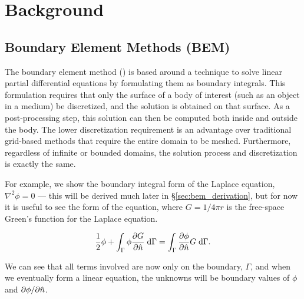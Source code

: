 
\chapter{Background}
\label{chapter:background}
\thispagestyle{myheadings}

\graphicspath{{./Background/}}

\section{Boundary Element Methods (BEM)}\label{sec:bem}

The boundary element method ({\bem}) is based around a technique to solve linear partial differential equations by formulating them as boundary integrals. This formulation requires that only the surface of a body of interest (such as an object in a medium) be discretized, and the solution is obtained on that surface. As a post-processing step, this solution can then be computed both inside and outside the body. The lower discretization requirement is an advantage over traditional grid-based methods that require the entire domain to be meshed. Furthermore, regardless of infinite or bounded domains, the solution process and discretization is exactly the same.

For example, we show the boundary integral form of the Laplace equation, $\nabla^{2}\phi = 0$ --- this will be derived much later in \S\ref{sec:bem_derivation}, but for now it is useful to see the form of the equation, where $G=1/4\pi r$ is the free-space Green's function for the Laplace equation.

\begin{equation}\label{eqn:bem_background_full}
	\frac{1}{2}\phi + \int_{\Gamma} \phi\partiald{G}{\nhat}\;\di{\Gamma} = \int_{\Gamma}\partiald{\phi}{\nhat}G\;\di{\Gamma}.
\end{equation}

We can see that all terms involved are now only on the boundary, $\Gamma$, and when we eventually form a linear equation, the unknowns will be boundary values of $\phi$ and $\partial \phi / \partial \hat{n}$.

